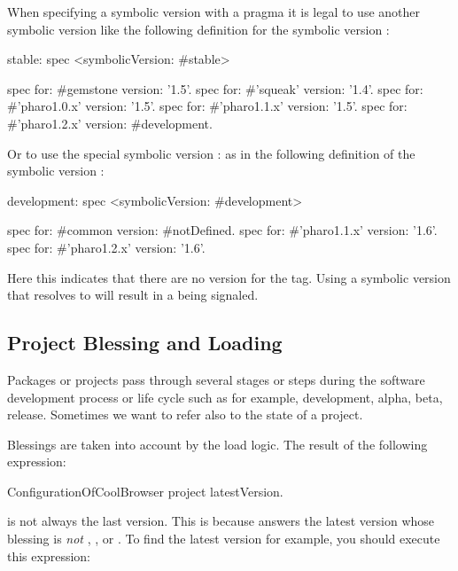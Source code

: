 \documentclass[a4paper,10pt,twoside]{book}
\begin{document}


When specifying a symbolic version with a  pragma it is legal to use another symbolic version like the following definition for the symbolic version :

\begin{code}{}
stable: spec
       <symbolicVersion: #stable>

       spec for: #gemstone version: '1.5'.
       spec for: #'squeak' version: '1.4'.
       spec for: #'pharo1.0.x' version: '1.5'.
       spec for: #'pharo1.1.x' version: '1.5'.
       spec for: #'pharo1.2.x' version: #development.
\end{code}

Or to use the special symbolic version : as in the following definition of the symbolic version :

\begin{code}{}
development: spec
       <symbolicVersion: #development>

       spec for: #common version: #notDefined.
       spec for: #'pharo1.1.x' version: '1.6'.
       spec for: #'pharo1.2.x' version: '1.6'.
\end{code}

Here this indicates that there are no version for the  tag. 
Using a symbolic version that resolves to  will result in a  being signaled.


\subsection{Project Blessing and Loading}
Packages or projects pass through several stages or steps during the software development process or life cycle such as for example, development, alpha, beta, release. Sometimes we want to refer also to the state of a project.

Blessings are taken into account by the load logic. The result of the following expression:
\begin{code}{}
ConfigurationOfCoolBrowser project latestVersion.
\end{code}
is not always the last version.  This is because  answers the latest version whose blessing is {\em not} , , or . To find the latest  version for example, you should execute this expression:
\end{document}
